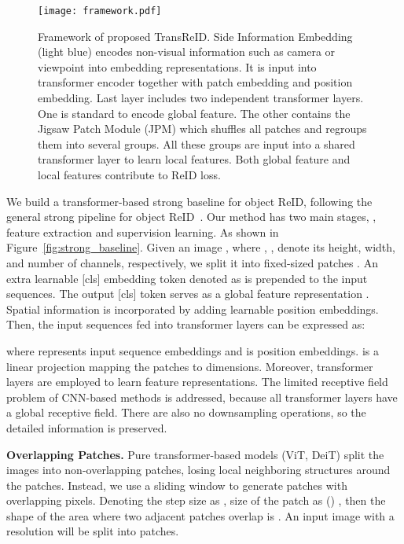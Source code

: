 \documentclass[10pt,twocolumn,letterpaper]{article}
\begin{document}
\begin{figure*}[ht]
    \vspace{-1.5em}
\begin{center}
   \texttt{[image: framework.pdf]}
\end{center}
    \vspace{-1em}
   \caption{Framework of proposed TransReID. Side Information Embedding (light blue) encodes non-visual information such as camera or viewpoint into embedding representations. It is input into transformer encoder together with patch embedding and position embedding. Last layer includes two independent transformer layers. One is standard to encode global feature. The other contains the Jigsaw Patch Module (JPM) which shuffles all patches and regroups them into several groups. All these groups are input into a shared transformer layer to learn local features. Both global feature and local features contribute to ReID loss.}
\label{fig:framework}
\end{figure*}

We build a transformer-based strong baseline for object ReID, following the general strong pipeline for object ReID~\cite{luo2019bag, MGN}. Our method has two main stages, \ie, feature extraction and supervision learning. 
As shown in Figure~\ref{fig:strong_baseline}. Given an image , where , ,  denote its height, width, and number of channels, respectively, we split it into  fixed-sized patches . An extra learnable [cls] embedding token denoted as  is prepended to the input sequences. The output [cls] token serves as a global feature representation . 
Spatial information is incorporated by adding learnable position embeddings. Then, the input sequences fed into transformer layers can be expressed as:

where  represents input sequence embeddings and  is position embeddings.  is a linear projection mapping the patches to  dimensions.
Moreover,  transformer layers are employed to learn feature representations. 
The limited receptive field problem of CNN-based methods is addressed, because all transformer layers have a global receptive field. There are also no downsampling operations, so the detailed information is preserved.

\textbf{Overlapping Patches.} 
Pure transformer-based models (\eg ViT, DeiT) split the images into non-overlapping patches, losing local neighboring structures around the patches. 
Instead, we use a sliding window to generate patches with overlapping pixels. Denoting the step size as , size of the patch as  (\eg ) , then the shape of the area where two adjacent patches overlap is . An input image with a resolution  will be split into  patches.
\end{document}
